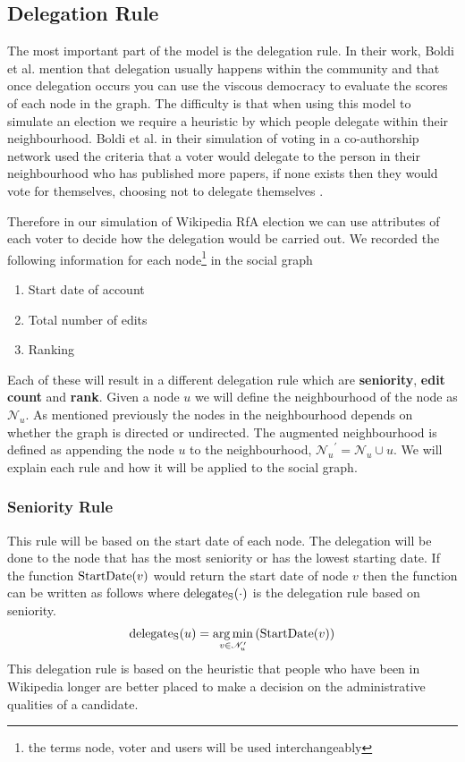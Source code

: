 \subsection{Delegation Rule}
The most important part of the model is the delegation rule. In their work, Boldi et al. mention that delegation usually happens within the community and that once delegation occurs you can use the viscous democracy to evaluate the scores of each node in the graph. The difficulty is that when using this model to simulate an election we require a heuristic by which people delegate within their neighbourhood. Boldi et al. in their simulation of voting in a co-authorship network used the criteria that a voter would delegate to the person in their neighbourhood who has published more papers, if none exists then they would vote for themselves, choosing not to delegate themselves \cite{ViscousDemocracy}.

Therefore in our simulation of Wikipedia RfA election we can use attributes of each voter to decide how the delegation would be carried out. We recorded the following information for each node\footnote{the terms node, voter and users will be used interchangeably} in the social graph
\begin{enumerate}
    \item Start date of account
    \item Total number of edits
    \item Ranking
\end{enumerate}
Each of these will result in a different delegation rule which are \textbf{seniority}, \textbf{edit count} and \textbf{rank}. Given a node $u$ we will define the neighbourhood of the node as $\mathcal{N}_u$. As mentioned previously the nodes in the neighbourhood depends on whether the graph is directed or undirected. The augmented neighbourhood is defined as appending the node $u$ to the neighbourhood, ${\mathcal{N}_u}^\prime = \mathcal{N}_u \cup u$. We will explain each rule and how it will be applied to the social graph.

\subsubsection{Seniority Rule}
This rule will be based on the start date of each node. The delegation will be done to the node that has the most seniority or has the lowest starting date. If the function $\operatorname*{StartDate}(v)$ would return the start date of node $v$ then the function can be written as follows where $\operatorname*{delegate_S}(\cdot)$ is the delegation rule based on seniority.
\[\operatorname*{delegate_S}(u)  = \operatorname*{arg\,min}_{v \in \mathcal{N}_u^\prime} \left( \operatorname*{StartDate}(v) \right)\]
This delegation rule is based on the heuristic that people who have been in Wikipedia longer are better placed to make a decision on the administrative qualities of a candidate. 

